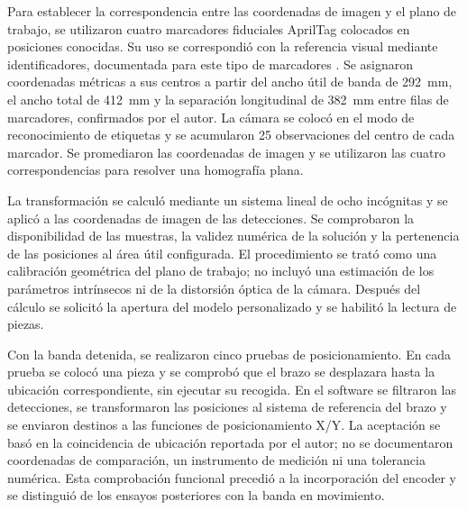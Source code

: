 Para establecer la correspondencia entre las coordenadas de imagen y el plano de trabajo, se utilizaron cuatro marcadores fiduciales AprilTag colocados en posiciones conocidas. Su uso se correspondió con la referencia visual mediante identificadores, documentada para este tipo de marcadores \cite{apriltag_fase5}. Se asignaron coordenadas métricas a sus centros a partir del ancho útil de banda de 292~mm, el ancho total de 412~mm y la separación longitudinal de 382~mm entre filas de marcadores, confirmados por el autor. La cámara se colocó en el modo de reconocimiento de etiquetas y se acumularon 25 observaciones del centro de cada marcador. Se promediaron las coordenadas de imagen y se utilizaron las cuatro correspondencias para resolver una homografía plana.

La transformación se calculó mediante un sistema lineal de ocho incógnitas y se aplicó a las coordenadas de imagen de las detecciones. Se comprobaron la disponibilidad de las muestras, la validez numérica de la solución y la pertenencia de las posiciones al área útil configurada. El procedimiento se trató como una calibración geométrica del plano de trabajo; no incluyó una estimación de los parámetros intrínsecos ni de la distorsión óptica de la cámara. Después del cálculo se solicitó la apertura del modelo personalizado y se habilitó la lectura de piezas.

Con la banda detenida, se realizaron cinco pruebas de posicionamiento. En cada prueba se colocó una pieza y se comprobó que el brazo se desplazara hasta la ubicación correspondiente, sin ejecutar su recogida. En el software se filtraron las detecciones, se transformaron las posiciones al sistema de referencia del brazo y se enviaron destinos a las funciones de posicionamiento X/Y. La aceptación se basó en la coincidencia de ubicación reportada por el autor; no se documentaron coordenadas de comparación, un instrumento de medición ni una tolerancia numérica. Esta comprobación funcional precedió a la incorporación del encoder y se distinguió de los ensayos posteriores con la banda en movimiento.

